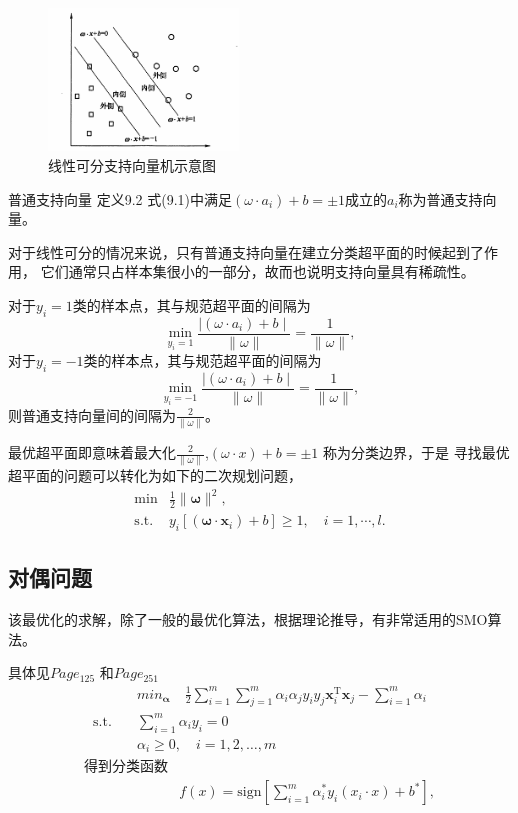 \documentclass[12pt]{ctexart}
\numberwithin{equation}{section} %
\begin{document}
\begin{figure}[h!] %
  \centering %
  \includegraphics[width=0.45\textwidth]{pi/线性可分支持向量机.png} %
  \caption{线性可分支持向量机示意图} %
  \label{fig:线性可分支持向量机} %
\end{figure}
\begin{mydef}{普通支持向量}
定义9.2 式(9.1)中满足$(\omega\cdot a_i)+b=\pm1$成立的$a_i$称为普通支持向量。
\end{mydef}

对于线性可分的情况来说，只有普通支持向量在建立分类超平面的时候起到了作用， 它们通常只占样本集很小的一部分，故而也说明支持向量具有稀疏性。

对于$y_i=1$类的样本点，其与规范超平面的间隔为
$$\underset{y_{i}=1}{\operatorname*{min}}\frac{\mid(\omega\cdot a_{i})+b\mid}{\parallel\omega\parallel}=\frac{1}{\parallel\omega\parallel},$$
对于$y_{i}=-1$类的样本点，其与规范超平面的间隔为
$$\underset{y_{i}=-1}{\operatorname*{min}}\frac{\mid(\omega\cdot a_{i})+b\mid}{\parallel\omega\parallel}=\frac{1}{\parallel\omega\parallel},$$
则普通支持向量间的间隔为$\frac2{\|\omega\|}$。

最优超平面即意味着最大化$\frac2{\|\omega\|}$,$(\omega\cdot x)+b=\pm1$ 称为分类边界，于是
寻找最优超平面的问题可以转化为如下的二次规划问题，
$$\begin{array}{ll}\min&\frac{1}{2}\|\boldsymbol{\omega}\|^2,\\\mathrm{s.t.}&y_i[ (\boldsymbol{\omega}\cdot\boldsymbol{x}_i)+b ]\geqslant1 ,\quad i=1 ,\cdots,l.\end{array}
$$
\subsection{对偶问题}
该最优化的求解，除了一般的最优化算法，根据理论推导，有非常适用的SMO算法。

具体见\cite{周志华}$Page_{125}$  和\cite{司守奎}$Page_{251}$
\[
\begin{aligned}
& min_{\boldsymbol{\alpha}} \quad  \frac{1}{2} \sum_{i=1}^m \sum_{j=1}^m \alpha_i \alpha_j y_i y_j \boldsymbol{x}_i^\mathrm{T} \boldsymbol{x}_j-\sum_{i=1}^m \alpha_i\\
\text{s.t.} \quad & \sum_{i=1}^m \alpha_i y_i = 0 \\
& \alpha_i \geq 0, \quad i = 1, 2, \ldots, m
\end{aligned}
\]
\[\begin{aligned}\text{得到分类函数}\\&f(x)=\mathrm{sign}[\sum_{i=1}^{m}\alpha_{i}^{*}y_{i}(x_{i}\cdot x) +b^{*}] ,\end{aligned}
\]
\end{document}
